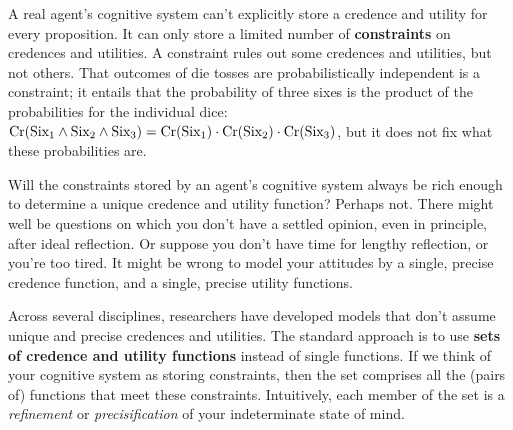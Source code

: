 A real agent's cognitive system can't explicitly store a credence and utility
for every proposition. It can only store a limited number of
\textbf{constraints} on credences and utilities. A constraint rules out some
credences and utilities, but not others. That outcomes of die tosses are
probabilistically independent is a constraint; it entails that the probability
of three sixes is the product of the probabilities for the individual dice:
$\text{Cr}(\text{Six}_1 \land \text{Six}_2 \land \text{Six}_3) = \text{Cr}(\text{Six}_1)\cdot \text{Cr}(\text{Six}_2)\cdot \text{Cr}(\text{Six}_3)$,
but it does not fix what these probabilities are.

Will the constraints stored by an agent's cognitive system always be rich enough
to determine a unique credence and utility function? Perhaps not. There might
well be questions on which you don't have a settled opinion, even in principle,
after ideal reflection. Or suppose you don't have time for lengthy reflection,
or you're too tired. It might be wrong to model your attitudes by a single,
precise credence function, and a single, precise utility functions.

Across several disciplines, researchers have developed models that don't assume
unique and precise credences and utilities. The standard approach is to use
\textbf{sets of credence and utility functions} instead of single functions. If
we think of your cognitive system as storing constraints, then the set comprises
all the (pairs of) functions that meet these constraints. Intuitively, each
member of the set is a \emph{refinement} or \emph{precisification} of your
indeterminate state of mind.



